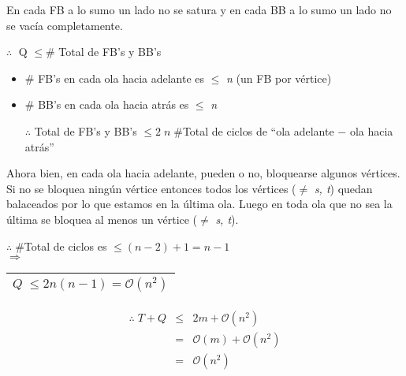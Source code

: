 \documentclass[12pt,a4paper]{report}
\newcounter{neq}
\begin{document}
			En cada FB a lo sumo un lado no se satura y en cada BB a lo sumo un lado no se vacía completamente.
			
			\vspace{2mm}
			$\therefore \;$ Q $\leq \#$ Total de FB's y BB's 
	
			\begin{itemize}
				\item $\#$ FB's en cada ola hacia adelante es $\leq$ \textit{n} (un FB por vértice)
				\item $\#$ BB's en cada ola hacia atrás es $\leq$ \textit{n}

				$\therefore$ Total de FB's y BB's $\leq 2 \; n \; \#$Total de ciclos de \textquotedblleft ola adelante $-$ ola hacia atrás\textquotedblright
 			\end{itemize}
	
			Ahora bien, en cada ola hacia adelante, pueden o no, bloquearse algunos vértices. Si no se bloquea ningún vértice entonces todos los vértices ($\neq$ \textit{s, t}) quedan balaceados por lo que estamos en la última ola. Luego en toda ola que no sea la última se bloquea al menos un vértice ($\neq$ \textit{s, t}).
			
			\begin{center}
			$\therefore \; \#$Total de ciclos es $\leq (n-2)+1 = n-1$ \\
			$\Rightarrow$ \begin{tabular}{|c|} \hline $Q \; \leq 2 n (n-1) = \mathcal{O}(n^{2})$ \\ \hline \end{tabular}
			\end{center}
	
			\begin{eqnarray}
				\nonumber \therefore \; T + Q & \leq & 2 m + \mathcal{O}(n^{2}) \\
				\nonumber & = & \mathcal{O}(m) + \mathcal{O}(n^{2}) \\
				\nonumber & = & \mathcal{O}(n^{2})
			\end{eqnarray}

	
	
	
	
	
	
	
	
	
	
	
	
	
	
	
	
	
	
	
	
	
	
\end{document}
